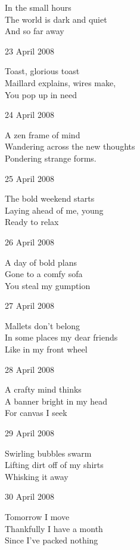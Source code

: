 \documentclass[12pt]{article}
\begin{document}
In the small hours \\
The world is dark and quiet \\
And so far away

23 April 2008

Toast, glorious toast \\
Maillard explains, wires make, \\
You pop up in need

\newpage

24 April 2008

A zen frame of mind \\
Wandering across the new thoughts \\
Pondering strange forms.

25 April 2008

The bold weekend starts \\
Laying ahead of me, young \\
Ready to relax

26 April 2008

A day of bold plans \\
Gone to a comfy sofa \\
You steal my gumption

27 April 2008

Mallets don't belong \\
In some places my dear friends \\
Like in my front wheel

28 April 2008

A crafty mind thinks \\
A banner bright in my head \\
For canvas I seek

29 April 2008

Swirling bubbles swarm \\
Lifting dirt off of my shirts \\
Whisking it away

30 April 2008

Tomorrow I move \\
Thankfully I have a month \\
Since I've packed nothing


\newpage
\end{document}
